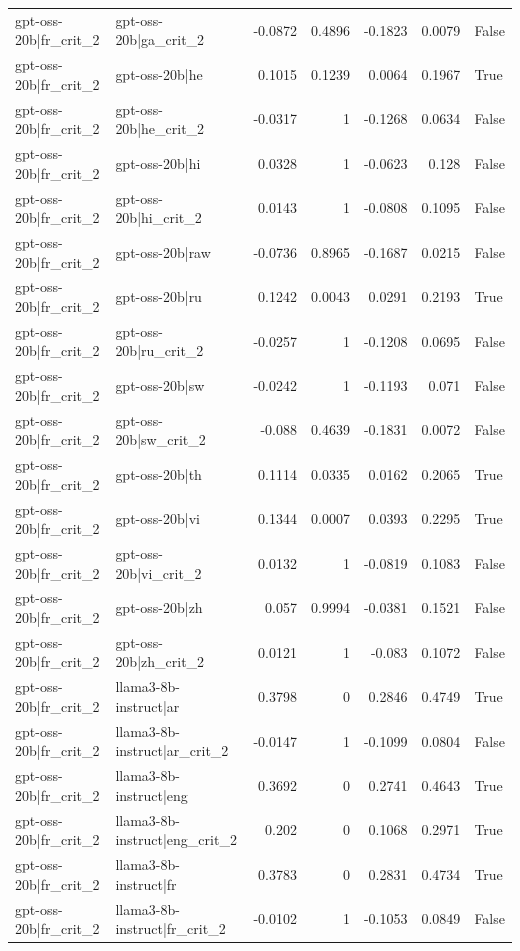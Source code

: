 \begin{table}
\begin{tabular}{l l r r r r l}
gpt-oss-20b|fr_crit_2 & gpt-oss-20b|ga_crit_2 & -0.0872 & 0.4896 & -0.1823 & 0.0079 & False \\
gpt-oss-20b|fr_crit_2 & gpt-oss-20b|he & 0.1015 & 0.1239 & 0.0064 & 0.1967 & True \\
gpt-oss-20b|fr_crit_2 & gpt-oss-20b|he_crit_2 & -0.0317 & 1 & -0.1268 & 0.0634 & False \\
gpt-oss-20b|fr_crit_2 & gpt-oss-20b|hi & 0.0328 & 1 & -0.0623 & 0.128 & False \\
gpt-oss-20b|fr_crit_2 & gpt-oss-20b|hi_crit_2 & 0.0143 & 1 & -0.0808 & 0.1095 & False \\
gpt-oss-20b|fr_crit_2 & gpt-oss-20b|raw & -0.0736 & 0.8965 & -0.1687 & 0.0215 & False \\
gpt-oss-20b|fr_crit_2 & gpt-oss-20b|ru & 0.1242 & 0.0043 & 0.0291 & 0.2193 & True \\
gpt-oss-20b|fr_crit_2 & gpt-oss-20b|ru_crit_2 & -0.0257 & 1 & -0.1208 & 0.0695 & False \\
gpt-oss-20b|fr_crit_2 & gpt-oss-20b|sw & -0.0242 & 1 & -0.1193 & 0.071 & False \\
gpt-oss-20b|fr_crit_2 & gpt-oss-20b|sw_crit_2 & -0.088 & 0.4639 & -0.1831 & 0.0072 & False \\
gpt-oss-20b|fr_crit_2 & gpt-oss-20b|th & 0.1114 & 0.0335 & 0.0162 & 0.2065 & True \\
gpt-oss-20b|fr_crit_2 & gpt-oss-20b|vi & 0.1344 & 0.0007 & 0.0393 & 0.2295 & True \\
gpt-oss-20b|fr_crit_2 & gpt-oss-20b|vi_crit_2 & 0.0132 & 1 & -0.0819 & 0.1083 & False \\
gpt-oss-20b|fr_crit_2 & gpt-oss-20b|zh & 0.057 & 0.9994 & -0.0381 & 0.1521 & False \\
gpt-oss-20b|fr_crit_2 & gpt-oss-20b|zh_crit_2 & 0.0121 & 1 & -0.083 & 0.1072 & False \\
gpt-oss-20b|fr_crit_2 & llama3-8b-instruct|ar & 0.3798 & 0 & 0.2846 & 0.4749 & True \\
gpt-oss-20b|fr_crit_2 & llama3-8b-instruct|ar_crit_2 & -0.0147 & 1 & -0.1099 & 0.0804 & False \\
gpt-oss-20b|fr_crit_2 & llama3-8b-instruct|eng & 0.3692 & 0 & 0.2741 & 0.4643 & True \\
gpt-oss-20b|fr_crit_2 & llama3-8b-instruct|eng_crit_2 & 0.202 & 0 & 0.1068 & 0.2971 & True \\
gpt-oss-20b|fr_crit_2 & llama3-8b-instruct|fr & 0.3783 & 0 & 0.2831 & 0.4734 & True \\
gpt-oss-20b|fr_crit_2 & llama3-8b-instruct|fr_crit_2 & -0.0102 & 1 & -0.1053 & 0.0849 & False \\

\end{tabular}
\end{table}
